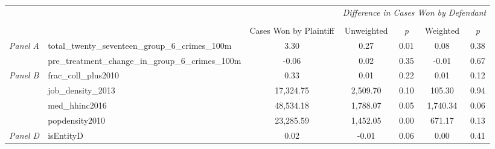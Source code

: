 \begin{tabular}{llccccc}
\toprule
 &  & \textit{} & \multicolumn{4}{c}{\textit{Difference in Cases Won by Defendant}} \\
\cline{4-7}
\\
 &  & Cases Won by Plaintiff & Unweighted & \emph{p} & Weighted & \emph{p} \\
\midrule
\multirow[c]{2}{3cm}{\textit{Panel A}} & total_twenty_seventeen_group_6_crimes_100m & 3.30 & 0.27 & 0.01 & 0.08 & 0.38 \\
 & pre_treatment_change_in_group_6_crimes_100m & -0.06 & 0.02 & 0.35 & -0.01 & 0.67 \\
\cline{1-7}
\multirow[c]{4}{3cm}{\textit{Panel B}} & frac_coll_plus2010 & 0.33 & 0.01 & 0.22 & 0.01 & 0.12 \\
 & job_density_2013 & 17,324.75 & 2,509.70 & 0.10 & 105.30 & 0.94 \\
 & med_hhinc2016 & 48,534.18 & 1,788.07 & 0.05 & 1,740.34 & 0.06 \\
 & popdensity2010 & 23,285.59 & 1,452.05 & 0.00 & 671.17 & 0.13 \\
\cline{1-7}
\textit{Panel D} & isEntityD & 0.02 & -0.01 & 0.06 & 0.00 & 0.41 \\
\cline{1-7}
\bottomrule
\end{tabular}
